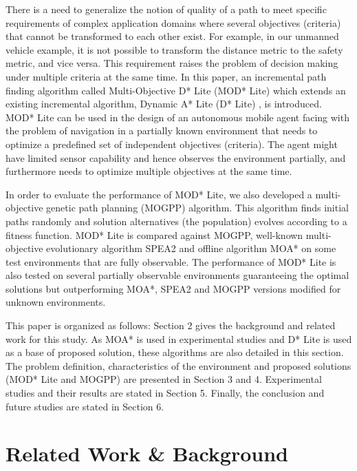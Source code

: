 \documentclass[10pt,journal]{IEEEtran}
\begin{document}
There is a need to generalize the notion of quality of a path to meet specific requirements of complex application domains where several objectives (criteria) that cannot be transformed to each other exist. For example, in our unmanned vehicle example, it is not possible to transform the distance metric to the safety metric, and vice versa. This requirement raises the problem of  decision making under multiple criteria at the same time. In this paper, an incremental path finding algorithm called Multi-Objective D* Lite (MOD* Lite) which extends an existing incremental algorithm, Dynamic A* Lite (D* Lite) \cite{Koenig:2002}, is introduced. MOD* Lite \cite{Oral:2012} can be used in the design of an autonomous mobile agent facing with the problem of navigation in a partially known environment that needs to optimize a predefined set of independent objectives (criteria). The agent might have limited sensor capability and hence observes the environment partially, and furthermore needs to optimize multiple objectives at the same time.

In order to evaluate the performance of MOD* Lite, we also developed a multi-objective genetic path planning (MOGPP) algorithm. This algorithm finds initial paths randomly and solution alternatives (the population) evolves according to a fitness function. MOD* Lite is compared against MOGPP, well-known multi-objective evolutionary algorithm SPEA2 \cite{spea2:2001} and  offline algorithm MOA*  \cite{MOAStewart:1991}  on some test environments that are fully observable. The performance of MOD* Lite is also tested on several partially observable environments guaranteeing the optimal solutions but outperforming MOA*, SPEA2 and MOGPP versions modified for unknown environments.

This paper is organized as follows: Section 2 gives the background and related work for this study. As MOA* is used in experimental studies and D* Lite is used as a base of proposed solution, these algorithms are also detailed in this section. The problem definition, characteristics of the environment and proposed solutions (MOD* Lite and MOGPP) are presented in Section 3 and 4. Experimental studies and their results are stated in Section 5. Finally, the conclusion and future studies are stated in Section 6.


\section{Related Work \& Background}
\label{chapter:relatedwork}
\end{document}
